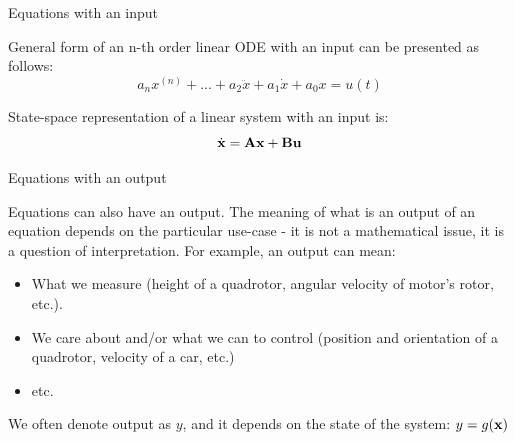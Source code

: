 \documentclass{beamer}
\begin{document}
\begin{frame}{Equations with an input}
	\begin{flushleft}
		
		General form of an n-th order linear ODE with an input can be presented as follows:
		\begin{equation}
			a_n x^{(n)} + 
			... +
			a_2 \ddot{x} + a_1 \dot{x} + 
			a_0 x = u(t)
		\end{equation}
	
	\bigskip
		
		State-space representation of a linear system with an input is:
		\begin{equation}
			\dot{\mathbf{x}} = \mathbf{A} \mathbf{x} + \mathbf{B} \mathbf{u}
		\end{equation}
		
		
	\end{flushleft}
\end{frame}







\begin{frame}{Equations with an output}
	\begin{flushleft}
		
		Equations can also have an output. The meaning of what is an output of an equation depends on the particular use-case - it is not a mathematical issue, it is a question of interpretation. For example, an output can mean:
		
		\begin{itemize}
			\item What we measure (height of a quadrotor, angular velocity of motor's rotor, etc.).
			
			\item We care about and/or what we can to control (position and orientation of a quadrotor, velocity of a car, etc.)
			
			\item etc.
		\end{itemize}
		
		We often denote output as $y$, and it depends on the state of the system: $y = g(\mathbf{x})$
		
	\end{flushleft}
\end{frame}
\end{document}
